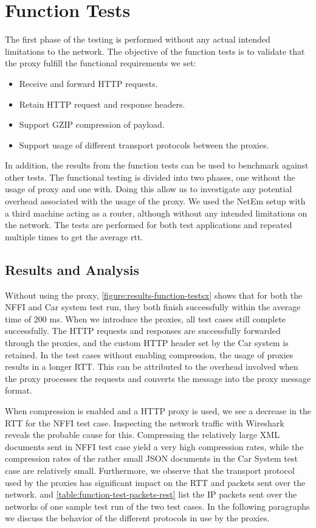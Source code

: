 \section{Function Tests}

The first phase of the testing is performed without any actual intended
limitations to the network. The objective of the function tests is to validate
that the proxy fulfill the functional requirements we set:

\begin{itemize}
    \item Receive and forward HTTP requests.
    \item Retain HTTP request and response headers.
    \item Support GZIP compression of payload.
    \item Support usage of different transport protocols between the proxies.
\end{itemize}

 In addition, the results from the function tests can be used to benchmark
 against other tests. The functional testing is divided into two phases, one
 without the usage of proxy and one with. Doing this allow us to investigate any
 potential overhead associated with the usage of the proxy. We used the NetEm
 setup with a third machine acting as a router, although without any intended
 limitations on the network. The tests are performed for both test applications
 and repeated multiple times to get the average \gls{rtt}.

\subsection{Results and Analysis}

Without using the proxy, \cref{figure:results-function-testsx} shows that for
both the NFFI and Car system test run, they both finish successfully within the
average time of 200 ms. When we introduce the proxies, all test cases still
complete successfully. The HTTP requests and responses are successfully
forwarded through the proxies, and the custom HTTP header set by the Car system is
retained. In the test cases without enabling compression, the usage of proxies
results in a longer RTT. This can be attributed to the overhead involved when
the proxy processes the requests and converts the message into the proxy message
format.

When compression is enabled and a HTTP proxy is used, we see a decrease in the RTT
for the NFFI test case. Inspecting the network traffic with Wireshark reveals
the probable cause for this. Compressing the relatively large XML documents sent
in NFFI test case yield a very high compression rates, while the compression rates
of the rather small JSON documents in the Car System test case are relatively
small. Furthermore, we observe that the transport protocol used by the proxies
has significant impact on the RTT and packets sent over the network.
 and
\cref{table:function-test-packets-rest} list the IP packets sent over the
networks of one sample test run of the two test cases. In the following
paragraphs we discuss the behavior of the different protocols in use by the
proxies.

